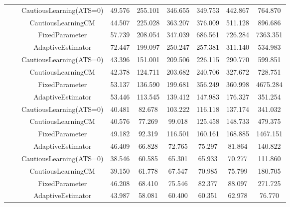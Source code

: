 \begin{table}[!h]
\begin{tabular}[t]{ccccccccc}
 &  & CautiousLearning(ATS=0) & 49.576 & 255.101 & 346.655 & 349.753 & 442.867 & 764.870\\

 &  & CautiousLearningCM & 44.507 & 225.028 & 363.207 & 376.009 & 511.128 & 896.686\\

 & \multirow[t]{-4}{*}{\centering\arraybackslash 0.25} & FixedParameter & 57.739 & 208.054 & 347.039 & 686.561 & 726.284 & 7363.351\\
\cmidrule{2-9}
 &  & AdaptiveEstimator & 72.447 & 199.097 & 250.247 & 257.381 & 311.140 & 534.983\\

 &  & CautiousLearning(ATS=0) & 43.396 & 151.001 & 209.506 & 226.115 & 290.770 & 599.851\\

 &  & CautiousLearningCM & 42.378 & 124.711 & 203.682 & 240.706 & 327.672 & 728.751\\

 & \multirow[t]{-4}{*}{\centering\arraybackslash 0.35} & FixedParameter & 53.137 & 136.590 & 199.681 & 356.249 & 360.998 & 4675.284\\
\cmidrule{2-9}
 &  & AdaptiveEstimator & 53.446 & 113.545 & 139.412 & 147.983 & 176.327 & 351.254\\

 &  & CautiousLearning(ATS=0) & 40.481 & 82.678 & 103.222 & 116.118 & 137.174 & 341.032\\

 &  & CautiousLearningCM & 40.576 & 77.269 & 99.018 & 125.458 & 148.733 & 479.375\\

 & \multirow[t]{-4}{*}{\centering\arraybackslash 0.50} & FixedParameter & 49.182 & 92.319 & 116.501 & 160.161 & 168.885 & 1467.151\\
\cmidrule{2-9}
 &  & AdaptiveEstimator & 46.409 & 66.828 & 72.765 & 75.297 & 81.864 & 140.822\\

 &  & CautiousLearning(ATS=0) & 38.546 & 60.585 & 65.301 & 65.933 & 70.277 & 111.860\\

 &  & CautiousLearningCM & 39.150 & 61.778 & 67.547 & 70.985 & 75.799 & 180.705\\

 & \multirow[t]{-4}{*}{\centering\arraybackslash 0.75} & FixedParameter & 46.208 & 68.410 & 75.546 & 82.377 & 88.097 & 271.725\\
\cmidrule{2-9}
 &  & AdaptiveEstimator & 43.987 & 58.081 & 60.400 & 60.351 & 62.978 & 76.770\\


\end{tabular}
\end{table}
